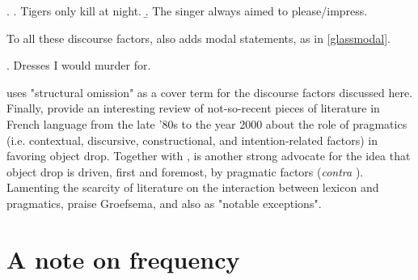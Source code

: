 \ex. \label{goldadd} \a. \label{goldadd3} Tigers only kill at night.
\b. \label{goldadd4} The singer always aimed to please/impress.

To all these discourse factors, \textcite[3]{Glass2020} also adds modal statements, as in \ref{glassmodal}.

\ex. \label{glassmodal} Dresses I would murder for.

\textcite[66]{Lorenzetti2008} uses "structural omission" as a cover term for the discourse factors discussed here. Finally, \textcite[46]{CumminsRoberge2005} provide an interesting review of not-so-recent pieces of literature in French language from the late '80s to the year 2000 about the role of pragmatics (i.e. contextual, discursive, constructional, and intention-related factors) in favoring object drop. Together with \textcite{Goldberg2001, Goldberg2005, Goldberg2005a, goldberg2006constructions}, \textcite{groefsema1995understood} is another strong advocate for the idea that object drop is driven, first and foremost, by pragmatic factors (\textit{contra} \textcite[29]{PethoKardos2006}). Lamenting the scarcity of literature on the interaction between lexicon and pragmatics, \textcite[7]{Garcia-VelascoMunoz2002} praise Groefsema, and also \textcite{Allerton1975, Fillmore1986, FellbaumKegl1989taxonomic} as "notable exceptions".


\section{A note on frequency}

